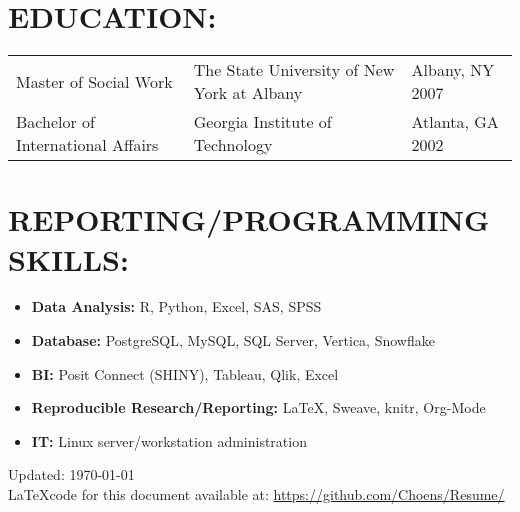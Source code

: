 \documentclass[line, mm, 10pt]{res}
\begin{document}
\begin{resume}
  
  
  \section{EDUCATION:}
  \begin{tabular} {p{2.25in} p{2.75in} p{2in}}
    Master of Social Work & The State University of New  York at Albany & Albany, NY 2007 \\
    Bachelor of International Affairs & Georgia Institute of Technology & Atlanta, GA 2002 \\
  \end{tabular}



  \section{REPORTING/PROGRAMMING SKILLS:}

  \begin{itemize}
    \item {\bf Data Analysis:} R, Python, Excel, SAS, SPSS
    \item {\bf Database:} PostgreSQL, MySQL, SQL Server, Vertica, Snowflake
    \item {\bf BI:} Posit Connect (SHINY), Tableau, Qlik, Excel 
    \item {\bf Reproducible Research/Reporting:} \LaTeX, Sweave, knitr, Org-Mode
    \item {\bf IT:} Linux server/workstation administration 
  \end{itemize}


\end{resume}

\vspace{.25in}
Updated: \today \\
\LaTeX code for this document available at:
\href{https://github.com/Choens/Resume/}{https://github.com/Choens/Resume/}
\end{document}
